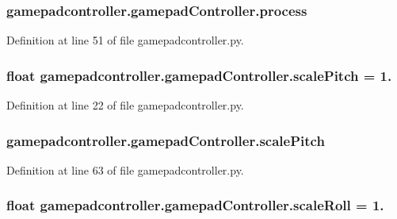 \hypertarget{classgamepadcontroller_1_1gamepadController_aec42e233c0618abef806d0b548dec8d4}{
\subsubsection[{process}]{\setlength{\rightskip}{0pt plus 5cm}gamepadcontroller.\-gamepad\-Controller.\-process}}\label{classgamepadcontroller_1_1gamepadController_aec42e233c0618abef806d0b548dec8d4}


Definition at line 51 of file gamepadcontroller.\-py.

\hypertarget{classgamepadcontroller_1_1gamepadController_a166739b1f1faef71ea463c544db75adf}{
\subsubsection[{scale\-Pitch}]{\setlength{\rightskip}{0pt plus 5cm}float gamepadcontroller.\-gamepad\-Controller.\-scale\-Pitch = 1.\hspace{0.3cm}{\ttfamily [static]}}}\label{classgamepadcontroller_1_1gamepadController_a166739b1f1faef71ea463c544db75adf}


Definition at line 22 of file gamepadcontroller.\-py.

\hypertarget{classgamepadcontroller_1_1gamepadController_a02885140d6d2efc1f469e063018a8c46}{
\subsubsection[{scale\-Pitch}]{\setlength{\rightskip}{0pt plus 5cm}gamepadcontroller.\-gamepad\-Controller.\-scale\-Pitch}}\label{classgamepadcontroller_1_1gamepadController_a02885140d6d2efc1f469e063018a8c46}


Definition at line 63 of file gamepadcontroller.\-py.

\hypertarget{classgamepadcontroller_1_1gamepadController_a15894d1acf2099bde66ec5869cf36724}{
\subsubsection[{scale\-Roll}]{\setlength{\rightskip}{0pt plus 5cm}float gamepadcontroller.\-gamepad\-Controller.\-scale\-Roll = 1.\hspace{0.3cm}{\ttfamily [static]}}}\label{classgamepadcontroller_1_1gamepadController_a15894d1acf2099bde66ec5869cf36724}



